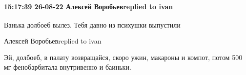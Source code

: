  
 
 
 
 

\paragraph{15:17:39 26-08-22 Алексей Воробьевreplied to ivan}

Ванька долбоеб вылез. Тебя давно из психушки выпустили 🤣🤣🤣

Алексей Воробьевreplied to ivan

Эй, долбоеб, в палату возвращайся, скоро ужин, макароны и компот, потом 500 мг
фенобарбитала внутривенно и баиньки.
